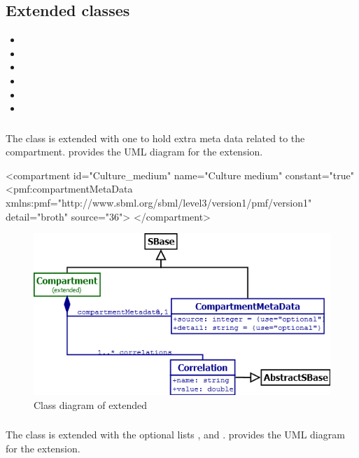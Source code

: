 \subsection{Extended classes}
\begin{itemize}
	\item \Compartment
	\item \Model
	\item \Parameter
	\item \Rule
	\item \Species
	\item \UnitDefinition
\end{itemize}

\subsubsection{}
The \Compartment class is extended with one \CompartmentMetaData to hold extra
meta data related to the compartment.  provides the UML
diagram for the extension.

\begin{example}
<compartment id="Culture_medium" name="Culture medium" constant="true"
  <pmf:compartmentMetaData xmlns:pmf="http://www.sbml.org/sbml/level3/version1/pmf/version1"
    detail="broth" source="36">
</compartment>
\end{example}

\begin{figure}
	\includegraphics[scale=0.8]{img/compartment_uml}
	\caption{Class diagram of extended \Compartment}
	\label{compartment_uml}
\end{figure}

\subsubsection{}
The \Model class is extended with the optional lists \ListOfPrimaryModels,
\ListOfDataSources and \ListOfPrimaryModels.  provides the UML
diagram for the extension.

